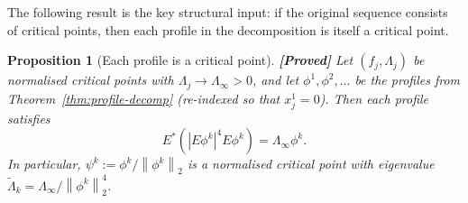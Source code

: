 \documentclass[12pt]{article}
\newtheorem{proposition}[theorem]{Proposition}
\theoremstyle{definition}
\theoremstyle{remark}
\newcommand{\norm}[1]{\left\|#1\right\|}
\newcommand{\proven}{\textbf{\color{teal}[Proved]}}
\begin{document}
The following result is the key structural input: if the original
sequence consists of critical points, then each profile in the
decomposition is itself a critical point.

\begin{proposition}[Each profile is a critical point]
  \label{prop:profile-critical}
  \proven\quad
  Let $(f_j,\Lambda_j)$ be normalised critical points with
  $\Lambda_j\to\Lambda_\infty>0$, and let $\phi^1,\phi^2,\ldots$
  be the profiles from Theorem~\ref{thm:profile-decomp} (re-indexed
  so that $x_j^1=0$).  Then each profile satisfies
  \begin{equation}\label{eq:profile-EL}
    E^*(|E\phi^k|^4E\phi^k) = \Lambda_\infty\phi^k.
  \end{equation}
  In particular, $\psi^k:=\phi^k/\norm{\phi^k}_2$ is a normalised
  critical point with eigenvalue
  $\widetilde\Lambda_k=\Lambda_\infty/\norm{\phi^k}_2^4$.
\end{proposition}
\end{document}

